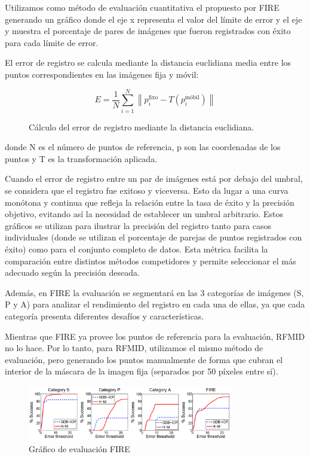 Utilizamos como método de evaluación cuantitativa el propuesto por FIRE \cite{FIRE}
generando un gráfico donde el eje x representa el valor del límite de error y el eje y muestra el porcentaje de pares de imágenes que fueron registrados con éxito para cada límite de error.

El error de registro se calcula mediante la distancia euclidiana media entre los puntos correspondientes en las imágenes fija y móvil:

\begin{figure}[tbp]
    \centering
    \[
    E = \frac{1}{N} \sum_{i=1}^{N} \left\| p_i^{\text{fixo}} - T(p_i^{\text{móbil}}) \right\|
    \]
    \caption{Cálculo del error de registro mediante la distancia euclidiana.}
    \label{fig:erro_registro}
\end{figure}

donde N es el número de puntos de referencia, p son las coordenadas de los puntos y T es la transformación aplicada.

Cuando el error de registro entre un par de imágenes está por debajo del umbral, se considera que el registro fue exitoso y viceversa. Esto da lugar a una curva monótona y continua que refleja la relación entre la tasa de éxito y la precisión objetivo, evitando así la necesidad de establecer un umbral arbitrario.
Estos gráficos se utilizan para ilustrar la precisión del registro tanto para casos individuales (donde se utilizan el porcentaje de parejas de puntos registrados con éxito)
como para el conjunto completo de datos.
Esta métrica facilita la comparación entre distintos métodos competidores y permite seleccionar el más adecuado según la precisión deseada.

Además, en FIRE la evaluación se segmentará en las 3 categorías de imágenes (S, P y A) para analizar el rendimiento del registro en cada una de ellas, ya que cada categoría presenta diferentes desafíos y características.

Mientras que FIRE ya provee los puntos de referencia para la evaluación, RFMID no lo hace.
Por lo tanto, para RFMID, utilizamos el mismo método de evaluación, pero generando los puntos manualmente de forma que cubran el interior de la máscara de la imagen fija (separados por 50 píxeles entre sí).

\begin{figure}[tbp]
    \centering
    \includegraphics[width=0.8\textwidth]{imaxes/fire_aval.png}
    \caption{Gráfico de evaluación FIRE \cite{FIRE}}
    \label{fig:fire_aval}
\end{figure}

